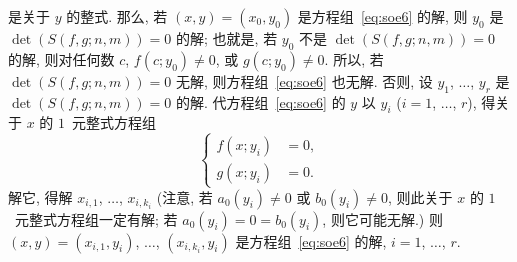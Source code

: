 \documentclass[../libro.tex]{subfiles}
\begin{document}
是关于 \(y\) 的整式.
那么, 若 \((x, y) = (x_0, y_0)\)
是方程组~\eqref{eq:soe6} 的解,
则 \(y_0\) 是 \(\det {(S(f, g; n, m))} = 0\) 的解;
也就是, 若 \(y_0\) 不是 \(\det {(S(f, g; n, m))} = 0\) 的解,
则对任何数 \(c\),
\(f(c; y_0) \neq 0\), 或 \(g(c; y_0) \neq 0\).
所以, 若 \(\det {(S(f, g; n, m))} = 0\) 无解,
则方程组~\eqref{eq:soe6} 也无解.
否则, 设 \(y_1\), \(\dots\), \(y_r\) 是
\(\det {(S(f, g; n, m))} = 0\) 的解.
代方程组~\eqref{eq:soe6} 的 \(y\) 以 \(y_i\)
(\(i = 1\), \(\dots\), \(r\)),
得关于 \(x\) 的 \(1\)~元整式方程组
\begin{equation*}
    \left\{ %
    \begin{aligned}
        f(x; y_i) & = 0, \\
        g(x; y_i) & = 0.
    \end{aligned}
    \right. %
\end{equation*}
解它, 得解 \(x_{i,1}\), \(\dots\), \(x_{i,k_i}\)
(注意, %
若 \(a_0 (y_i) \neq 0\) 或 \(b_0 (y_i) \neq 0\),
则此关于 \(x\) 的 \(1\)~元整式方程组一定有解;
若 \(a_0 (y_i) = 0 = b_0 (y_i)\),
则它可能无解.) %
则 \((x, y) = (x_{i,1}, y_i)\), \(\dots\), \((x_{i,k_i}, y_i)\)
是方程组~\eqref{eq:soe6} 的解,
\(i = 1\), \(\dots\), \(r\).
\end{document}
